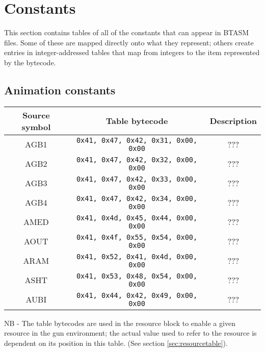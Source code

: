 \documentclass[12pt,a4paper]{scrbook}
\begin{document}
\section{Constants}
This section contains tables of all of the constants that can appear in BTASM files.
Some of these are mapped directly onto what they represent; others create entries in 
integer-addressed tables that map from integers to the item represented by the bytecode.

\subsection{Animation constants}
\label{sec:animtab}
\begin{center}
  \begin{tabular}{| c | c || c | }
    \hline
    Source symbol & Table bytecode & Description \\ \hline \hline
    AGB1 & \texttt{0x41, 0x47, 0x42, 0x31, 0x00, 0x00} & ???  \\ \hline
    AGB2 & \texttt{0x41, 0x47, 0x42, 0x32, 0x00, 0x00} & ???  \\ \hline
    AGB3 & \texttt{0x41, 0x47, 0x42, 0x33, 0x00, 0x00} & ???  \\ \hline
    AGB4 & \texttt{0x41, 0x47, 0x42, 0x34, 0x00, 0x00} & ???  \\ \hline
    AMED & \texttt{0x41, 0x4d, 0x45, 0x44, 0x00, 0x00} & ???  \\ \hline
    AOUT & \texttt{0x41, 0x4f, 0x55, 0x54, 0x00, 0x00} & ???  \\ \hline
    ARAM & \texttt{0x41, 0x52, 0x41, 0x4d, 0x00, 0x00} & ???  \\ \hline
    ASHT & \texttt{0x41, 0x53, 0x48, 0x54, 0x00, 0x00} & ???  \\ \hline
    AUBI & \texttt{0x41, 0x44, 0x42, 0x49, 0x00, 0x00} & ???  \\ \hline
  \end{tabular}
\end{center}
NB - The table bytecodes are used in the resource block to enable a given resource in the gun 
environment; the actual value used to refer to the resource is dependent on its position in this
table.  (See section \ref{sec:resourcetable}).
	
\end{document}
